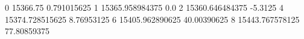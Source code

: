 0 15366.75 0.791015625
1 15365.958984375 0.0
2 15360.646484375 -5.3125
4 15374.728515625 8.76953125
6 15405.962890625 40.00390625
8 15443.767578125 77.80859375
